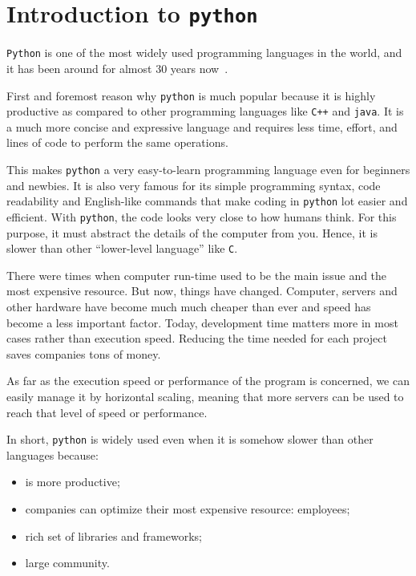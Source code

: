 \chapter{Introduction to \texttt{python}}
\label{introduction-to-python}

\texttt{Python} is one of the most widely used programming languages in the world, and it has been around for almost 30 years now~\cite{survey2019}.

First and foremost reason why \texttt{python} is much popular because it is highly productive as compared to other programming languages like \texttt{C++} and \texttt{java}. It is a much more concise and expressive language and requires less time, effort, and lines of code to perform the same operations.

This makes \texttt{python} a very easy-to-learn programming language even for beginners and newbies. It is also very famous for its simple programming syntax, code readability and English-like commands that make coding in \texttt{python} lot easier and efficient.
With \texttt{python}, the code looks very close to how humans think. For this purpose, it must abstract the details of the computer from you. Hence, it is slower than other “lower-level language” like \texttt{C}.

There were times when computer run-time used to be the main issue and the most expensive resource. But now, things have changed. Computer, servers and other hardware have become much much cheaper than ever and speed has become a less important factor. Today, development time matters more in most cases rather than execution speed. Reducing the time needed for each project saves companies tons of money.

As far as the execution speed or performance of the program is concerned, we can easily manage it by horizontal scaling, meaning that more servers can be used to reach that level of speed or performance.

In short, \texttt{python} is widely used even when it is somehow slower than other languages because:
\begin{itemize}
\tightlist
\item is more productive;
\item companies can optimize their most expensive resource: employees;
\item rich set of libraries and frameworks;
\item large community.
\end{itemize}

